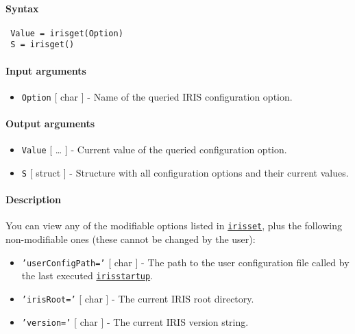 


	\paragraph{Syntax}
 
 \begin{verbatim}
 Value = irisget(Option)
 S = irisget()
 \end{verbatim}
 
 \paragraph{Input arguments}
 
 \begin{itemize}
 \item
   \texttt{Option} {[} char {]} - Name of the queried IRIS configuration
   option.
 \end{itemize}
 
 \paragraph{Output arguments}
 
 \begin{itemize}
 \item
   \texttt{Value} {[} \ldots{} {]} - Current value of the queried
   configuration option.
 \item
   \texttt{S} {[} struct {]} - Structure with all configuration options
   and their current values.
 \end{itemize}
 
 \paragraph{Description}
 
 You can view any of the modifiable options listed in
 \href{config/irisset}{\texttt{irisset}}, plus the following
 non-modifiable ones (these cannot be changed by the user):
 
 \begin{itemize}
 \item
   \texttt{'userConfigPath='} {[} char {]} - The path to the user
   configuration file called by the last executed
   \href{config/irisstartup}{\texttt{irisstartup}}.
 \item
   \texttt{'irisRoot='} {[} char {]} - The current IRIS root directory.
 \item
   \texttt{'version='} {[} char {]} - The current IRIS version string.
 \end{itemize}
 
